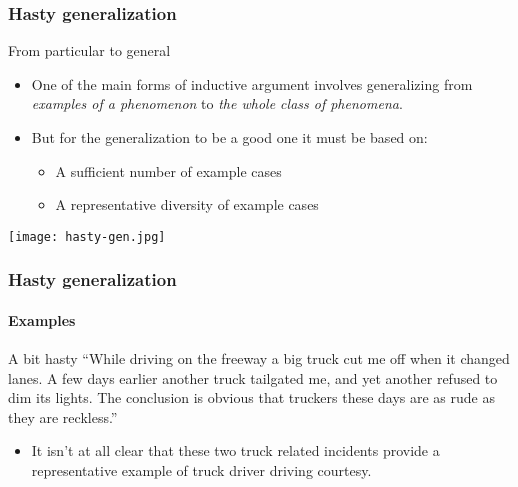 \documentclass[10pt,letterpaper,xcolor=dvipsnames,handout]{beamer}
\begin{document}
\begin{frame}
  \frametitle{Hasty generalization}
  
  \begin{block}{From particular to general}
    \begin{itemize}
      \item One of the main forms of inductive argument involves generalizing from \textit{examples of a phenomenon} to \textit{the whole class of phenomena}.
      \item But for the generalization to be a good one it must be based on:
      \begin{itemize}
        \item A sufficient number of example cases
        \item A representative diversity of example cases
      \end{itemize}
    \end{itemize}
  \end{block}
  
  \begin{center}
    \texttt{[image: hasty-gen.jpg]}
  \end{center}
  
\end{frame}

\begin{frame}
  \frametitle{Hasty generalization}
  \framesubtitle{Examples}
  
  \begin{block}{A bit hasty}
    ``While driving on the freeway a big truck cut me off when it changed lanes.  A few days earlier another truck tailgated me, and yet another refused to dim its lights.  The conclusion is obvious that truckers these days are as rude as they are reckless.''
  \end{block}
  
  \begin{itemize}
    \item<2-> It isn't at all clear that these two truck related incidents provide a representative example of truck driver driving courtesy.
  \end{itemize}
\end{frame}
\end{document}
